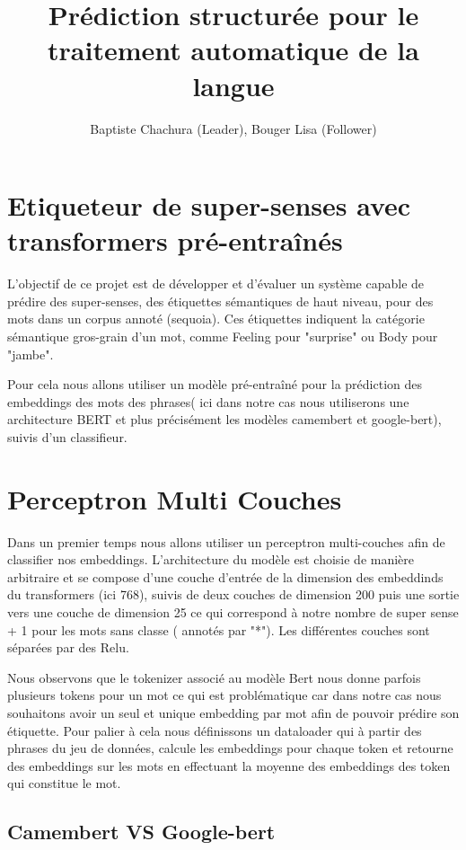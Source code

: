 \documentclass[12pt]{article}
\title{Prédiction structurée pour le traitement automatique de la langue}
\author{Baptiste Chachura (Leader), Bouger Lisa (Follower)}
\begin{document}
\maketitle
\vspace{-0.2in} %

\tableofcontents
\newpage

\section{Etiqueteur de super-senses avec transformers pré-entraînés}
L’objectif de ce projet est de développer et d’évaluer un système capable de prédire des super-senses, des étiquettes sémantiques 
de haut niveau, pour des mots dans un corpus annoté (sequoia). Ces étiquettes indiquent la catégorie sémantique gros-grain d’un mot,
comme Feeling pour "surprise" ou Body pour "jambe".

Pour cela nous allons utiliser un modèle pré-entraîné pour la prédiction des embeddings des mots des phrases( ici dans notre cas 
nous utiliserons une architecture BERT et plus précisément les modèles camembert et google-bert), suivis d'un classifieur.

\section{Perceptron Multi Couches}
Dans un premier temps nous allons utiliser un perceptron multi-couches afin de classifier nos embeddings. L'architecture du modèle est choisie
de manière arbitraire et se compose d'une couche d'entrée de la dimension des embeddinds du transformers (ici 768), suivis de deux couches 
de dimension 200 puis une sortie vers une couche de dimension 25 ce qui correspond à notre nombre de super sense + 1 pour les mots sans classe ( annotés par "*"). 
Les différentes couches sont séparées par des Relu.

Nous observons que le tokenizer associé au modèle Bert nous donne parfois plusieurs tokens pour un mot ce qui est problématique car 
dans notre cas nous souhaitons avoir un seul et unique embedding par mot afin de pouvoir prédire son étiquette. Pour palier à cela nous
définissons un dataloader qui à partir des phrases du jeu de données, calcule les embeddings pour chaque token et retourne des embeddings sur les mots en effectuant la 
moyenne des embeddings des token qui constitue le mot.
\subsection{Camembert VS Google-bert}
\end{document}
